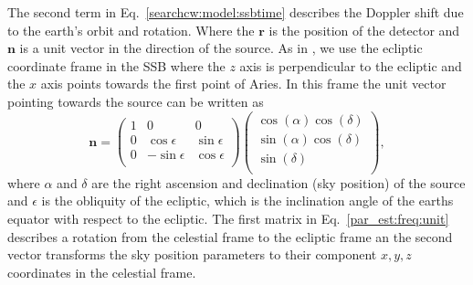 The second term in Eq.~\ref{searchcw:model:ssbtime} describes the Doppler shift
due to the earth's orbit and rotation.  Where the $\bm{r}$ is the position of
the detector and $\bm{n}$ is a unit vector in the direction of the source.  As
in \citep{schutz1998DataAnalysis}, we use the ecliptic coordinate frame in the \gls{SSB}
where the $z$ axis is perpendicular to the ecliptic and the $x$ axis points towards the first point of Aries.  In this frame the unit vector pointing
towards the source can be written as
%
\begin{equation}
    \label{par_est:freq:unit}
    \bm{n} = 
    \left(
    \begin{matrix}
        1 & 0 & 0  \\
        0 & \cos \epsilon & \sin \epsilon \\
        0 & -\sin \epsilon & \cos \epsilon \\
    \end{matrix} \right)
    \left(
    \begin{matrix}
        \cos(\alpha)\cos(\delta)  \\
        \sin(\alpha)\cos(\delta) \\
        \sin(\delta) \\
    \end{matrix} \right),
\end{equation}
%
where $\alpha$ and $\delta$ are the right ascension and declination (sky
position) of the source and $\epsilon$ is the obliquity of the ecliptic, which is the inclination angle of the earths equator with respect to the ecliptic.  The first matrix in Eq.~\ref{par_est:freq:unit} describes
a rotation from the celestial frame to
the ecliptic frame an the second vector transforms the sky position parameters to their component $x,y,z$ coordinates in the celestial frame.

